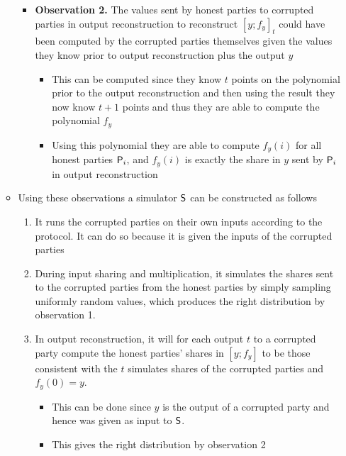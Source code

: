 \begin{itemize}
\begin{itemize}
\begin{itemize}
      \item \textbf{Observation 2.} The values sent by honest parties to corrupted parties in output reconstruction to reconstruct $[y; f_y]_t$ could have been computed by the corrupted parties themselves given the values they know prior to output reconstruction plus the output $y$
      \begin{itemize}
      	\item This can be computed since they know $t$ points on the polynomial prior to the output reconstruction and then using the result they now know $t+1$ points and thus they are able to compute the polynomial $f_y$ 
        \item Using this polynomial they are able to compute $f_y(i)$ for all honest parties $\P_i$, and $f_y(i)$ is exactly the share in $y$ sent by $\P_i$ in output reconstruction
      \end{itemize}
    \end{itemize}
    \item Using these observations a simulator $\S$ can be constructed as follows
    \begin{enumerate}
    	\item It runs the corrupted parties on their own inputs according to the protocol. It can do so because it is given the inputs of the corrupted parties
      \item During input sharing and multiplication, it simulates the shares sent to the corrupted parties from the honest parties by simply sampling uniformly random values, which produces the right distribution by observation 1.
      \item In output reconstruction, it will for each output $t$ to a corrupted party compute the honest parties' shares in $[y;f_y]$ to be those consistent with the $t$ simulates shares of the corrupted parties and $f_y(0) = y$.
      \begin{itemize}
      	\item This can be done since $y$ is the output of a corrupted party and hence was given as input to $\S$. 
        \item This gives the right distribution by observation 2
      \end{itemize}
    \end{enumerate}
  \end{itemize}
\end{itemize}

\newpage

